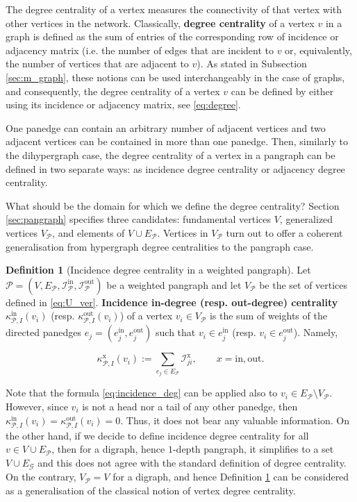 \documentclass[a4paper,12pt]{article}
\theoremstyle{definition}
\newtheorem{definition}{Definition}
\theoremstyle{remark}
\newcommand{\mG}{\mathcal{G}}
\newcommand{\mP}{\mathcal{P}}
\newcommand{\EP}{E_{\mathcal{P}}}
\newcommand{\tin}{\mathrm{in}}
\newcommand{\out}{\mathrm{out}}
\newcommand{\incip}{\mathcal{I}^{\tin}_{\mP}}
\newcommand{\incop}{\mathcal{I}^{\out}_{\mP}}
\begin{document}
The degree centrality of a vertex measures the connectivity of that vertex with other
vertices in the network. Classically, \textbf{degree centrality} of a vertex $v$ in a graph is defined as the sum of entries of the corresponding row of incidence or adjacency matrix (i.e. the number of edges that are incident to $v$ or, equivalently, the number of vertices that are adjacent to $v$). As stated in Subsection \ref{sec:m_graph}, these notions can be used interchangeably in the case of graphs, and consequently, the degree centrality of a vertex $v$ can be defined by either using its incidence or adjacency matrix, see \eqref{eq:degree}. 

One panedge can contain an arbitrary number of adjacent vertices and two adjacent vertices can be contained in more than one panedge. Then, similarly to the dihypergraph case, the degree centrality of a vertex in a pangraph can be defined in two separate ways: as incidence degree centrality or adjacency degree centrality. 

What should be the domain for which we define the degree centrality? Section \ref{sec:pangraph} specifies three candidates: fundamental vertices $V$, generalized vertices $V_{\mP}$, and elements of $V\cup E_{\mP}$. Vertices in $V_{\mP}$ turn out to offer a coherent generalisation from hypergraph degree centralities to the pangraph case. 
\begin{definition}[Incidence degree centrality in a weighted pangraph]\label{def:inci_deg}
    Let $\mP= (V,\EP, \incip,\incop)$ be a weighted pangraph and let $V_{\mP}$ be the set of vertices defined in \eqref{eq:U_ver}. \textbf{Incidence in-degree (resp. out-degree) centrality} $ \kappa_{\mP,I}^{\tin}(v_i)$ (resp. $\kappa_{\mP,I}^{\out}(v_i)$) of a vertex $v_i \in V_{\mP}$ is the sum of weights of the directed panedges $e_j=(e_j^{\mathrm{\tin}}, e_j^{\mathrm{\out}})$ such that $v_i \in e_j^{\tin}$ (resp. $v_i \in e_j^{\out}$). Namely,
    
\begin{equation} \label{eq:incidence_deg}
    \kappa_{\mP,I}^{\mathrm{x}}(v_i):=\sum_{e_j\in E_{\mP}}\mathcal{I}^{\textrm{x}}_{ji},\qquad x=\textrm{in},\textrm{out}.
\end{equation}
\end{definition}

Note that the formula \eqref{eq:incidence_deg} can be applied also to $v_i\in E_{\mP}\setminus V_{\mP}$. However, since $v_i$ is not a head nor a tail of any other panedge, then $\kappa_{\mP,I}^{\mathrm{in}}(v_i)=\kappa_{\mP,I}^{\mathrm{out}}(v_i)=0$. Thus, it does not bear any valuable information. On the other hand, if we decide to define incidence degree centrality for all $v\in V\cup E_{\mP}$, then for a digraph, hence $1$-depth pangraph, it simplifies to a set $V\cup E_{\mG}$ and this does not agree with the standard definition of degree centrality. On the contrary, $V_{\mP}=V$ for a digraph, and hence Definition \ref{def:inci_deg} can be considered as a generalisation of the classical notion of vertex degree centrality.
\end{document}
